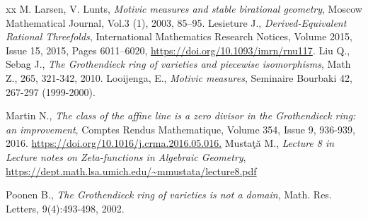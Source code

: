 \documentclass[a4, 11pt]{amsart}
\begin{document}
\begin{thebibliography}{xx}
 M. Larsen, V. Lunts, {\it Motivic measures and stable birational geometry}, Moscow Mathematical Journal, Vol.3 (1), 2003, 85–95.
 Lesieture J., {\it Derived-Equivalent Rational Threefolds}, International Mathematics Research Notices, Volume 2015, Issue 15, 2015, Pages 6011–6020, \url{https://doi.org/10.1093/imrn/rnu117}.
 Liu Q., Sebag J., {\it The Grothendieck ring of varieties and piecewise isomorphisms}, Math Z., 265, 321-342, 2010.
 Looijenga, E., {\it Motivic measures}, Seminaire Bourbaki 42, 267-297 (1999-2000).

 Martin N., {\it The class of the affine line is a zero divisor in the Grothendieck ring: an improvement}, Comptes Rendus Mathematique, Volume 354, Issue 9, 936-939, 2016.
\url{https://doi.org/10.1016/j.crma.2016.05.016.}
 Mustaţă M., {\it Lecture 8 in Lecture notes on Zeta-functions in Algebraic Geometry}, \url{https://dept.math.lsa.umich.edu/~mmustata/lecture8.pdf}


 Poonen B., {\it The Grothendieck ring of varieties is not a domain}, Math. Res. Letters, 9(4):493-498, 2002.
\end{thebibliography}
\end{document}
